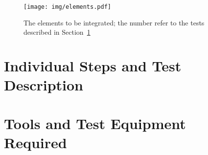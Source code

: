 \documentclass[a4paper, 12pt]{article}
\begin{document}
\begin{figure}[h!tb]
    \centering
    \texttt{[image: img/elements.pdf]}
    \label{fig:testplan}
    \caption{The elements to be integrated; the number refer to the tests described in Section~\ref{sub:individual_steps_and_test_description}}
\end{figure}

\newpage
\section{Individual Steps and Test Description}
\label{sub:individual_steps_and_test_description}



\newpage
\section{Tools and Test Equipment Required}
\label{sub:tools_and_test_equipment_required}
\end{document}
